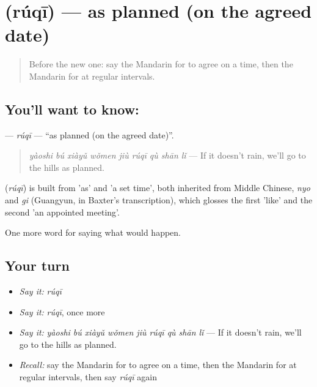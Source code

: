 \section[\texorpdfstring{\zh{如期} (rúqī)}{如期 (rúqī)}]{ (rúqī) — as planned (on the agreed date)}

\label{lesson:ZH-C390-ruqi}



\begin{quote}
Before the new one: say the Mandarin for to agree on a time, then the Mandarin for at regular intervals.
\end{quote}

\subsection*{You'll want to know: }
\textbf{} — \emph{rúqī} — \textquotedblleft{}as planned (on the agreed date)\textquotedblright{}.

\begin{quote}
\textbf{} \emph{yàoshi bú xiàyǔ wǒmen jiù rúqī qù shān lǐ} — If it doesn't rain, we'll go to the hills as planned.
\end{quote}

\begin{cousinweb}
\textbf{} (\emph{rúqī}) is built from  'as' and  'a set time', both inherited from Middle Chinese, \emph{nyo} and \emph{gi} (Guangyun, in Baxter's transcription), which glosses the first 'like' and the second 'an appointed meeting'.
\end{cousinweb}

\begin{grammarlens}[title={What you've built}]
One more word for saying what would happen.
\end{grammarlens}

\subsection*{Your turn}
\begin{itemize}
\raggedright
  \item \emph{Say it:} \emph{rúqī}
  \item \emph{Say it:} \emph{rúqī}, once more
  \item \emph{Say it:} \emph{yàoshi bú xiàyǔ wǒmen jiù rúqī qù shān lǐ} — If it doesn't rain, we'll go to the hills as planned.
  \item \emph{Recall:} say the Mandarin for to agree on a time, then the Mandarin for at regular intervals, then say \emph{rúqī} again
\end{itemize}

